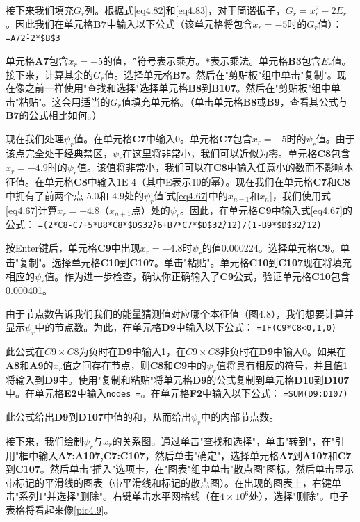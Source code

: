 \documentclass[12pt,a4paper,openany]{ctexbook}
\begin{document}
\begin{flushleft}
接下来我们填充\(G_r\)列。根据式\eqref{eq4.82}和\eqref{eq4.83}，对于简谐振子，\(G_r = x_r^2 - 2E_r\)。因此我们在单元格\textbf{B7}中输入以下公式（该单元格将包含\(x_r = -5\)时的\(G_r\)值）：
\texttt{=A7\^2-2*\$B\$3}

单元格\textbf{A7}包含\(x_r = -5\)的值，\texttt{\^}符号表示乘方。\texttt{*}表示乘法。单元格\textbf{B3}包含\(E_r\)值。接下来，计算其余的\(G_r\)值。选择单元格\textbf{B7}。然后在"剪贴板"组中单击"复制"。现在像之前一样使用"查找和选择"选择单元格\textbf{B8}到\textbf{B107}。然后在"剪贴板"组中单击"粘贴"。这会用适当的\(G_r\)值填充单元格。（单击单元格\textbf{B8}或\textbf{B9}，查看其公式与\textbf{B7}的公式相比如何。）

现在我们处理\(\psi_r\)值。在单元格\textbf{C7}中输入0。单元格\textbf{C7}包含\(x_r = -5\)时的\(\psi_r\)值。由于该点完全处于经典禁区，\(\psi_r\)在这里将非常小，我们可以近似为零。单元格\textbf{C8}包含\(x_r = -4.9\)时的\(\psi_r\)值。该值将非常小，我们可以在\textbf{C8}中输入任意小的数而不影响本征值。在单元格\textbf{C8}中输入\(1\text{E-}4\)（其中E表示10的幂）。现在我们在单元格\textbf{C7}和\textbf{C8}中拥有了前两个点-5.0和-4.9处的\(\psi_r\)值[式\eqref{eq4.67}中的\(x_{n-1}\)和\(x_n\)]，我们使用式\eqref{eq4.67}计算\(x_r = -4.8\)（\(x_{n+1}\)点）处的\(\psi_r\)。因此，在单元格\textbf{C9}中输入式\eqref{eq4.67}的公式：
\texttt{=(2*C8-C7+5*B8*C8*\$D\$3\^2/6+B7*C7*\$D\$3\^2/12)/(1-B9*\$D\$3\^2/12)}

按Enter键后，单元格\textbf{C9}中出现\(x_r = -4.8\)时\(\psi_r\)的值0.000224。选择单元格\textbf{C9}。单击"复制"。选择单元格\textbf{C10}到\textbf{C107}。单击"粘贴"。单元格\textbf{C10}到\textbf{C107}现在将填充相应的\(\psi_r\)值。作为进一步检查，确认你正确输入了\textbf{C9}公式，验证单元格\textbf{C10}包含0.000401。

由于节点数告诉我们我们的能量猜测值对应哪个本征值（图4.8），我们想要计算并显示\(\psi_r\)中的节点数。为此，在单元格\textbf{D9}中输入以下公式：
\texttt{=IF(C9*C8<0,1,0)}

此公式在\(C9 \times C8\)为负时在\textbf{D9}中输入1，在\(C9 \times C8\)非负时在\textbf{D9}中输入0。如果在\textbf{A8}和\textbf{A9}的\(x_r\)值之间存在节点，则\textbf{C8}和\textbf{C9}中的\(\psi_r\)值将具有相反的符号，并且值1将输入到\textbf{D9}中。使用"复制和粘贴"将单元格\textbf{D9}的公式复制到单元格\textbf{D10}到\textbf{D107}中。在单元格\textbf{E2}中输入\texttt{nodes =}。在单元格\textbf{F2}中输入以下公式：
\texttt{=SUM(D9:D107)}

此公式给出\textbf{D9}到\textbf{D107}中值的和，从而给出\(\psi_r\)中的内部节点数。

接下来，我们绘制\(\psi_r\)与\(x_r\)的关系图。通过单击"查找和选择"，单击"转到"，在"引用"框中输入\textbf{A7:A107,C7:C107}，然后单击"确定"，选择单元格\textbf{A7}到\textbf{A107}和\textbf{C7}到\textbf{C107}。然后单击"插入"选项卡，在"图表"组中单击"散点图"图标，然后单击显示带标记的平滑线的图表（带平滑线和标记的散点图）。在出现的图表上，右键单击"系列1"并选择"删除"。右键单击水平网格线（在\(4 \times 10^6\)处），选择"删除"。电子表格将看起来像\ref{pic4.9}。


\end{flushleft}
\end{document}
